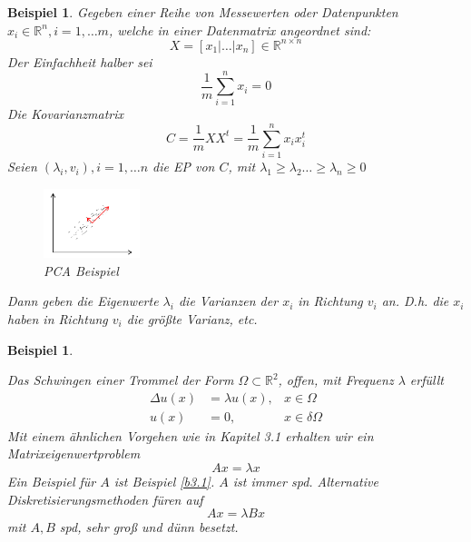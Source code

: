 \documentclass{book}
\newtheorem{example}[algorithm]{Beispiel}
\def\R{\mathbb{R}}
\begin{document}
            \begin{example}\label{b4.5}
                Gegeben einer Reihe von Messewerten  oder Datenpunkten $x_i\in\R^n,i=1,\dots m$, welche in einer Datenmatrix angeordnet sind:
                \begin{equation*}
                    X=[x_1\vert\dots\vert x_n]\in\R^{n\times n}
                \end{equation*}
                Der Einfachheit halber sei \[\frac{1}{m}\sum_{i=1}^nx_i=0\]
                Die Kovarianzmatrix 
                \[C=\frac{1}{m}XX^t=\frac{1}{m}\sum_{i=1}^n x_ix_i^t\]
                Seien $(\lambda_i,v_i),i=1,\dots n$ die EP von $C$, mit $\lambda_1\geq \lambda_2\dots\geq \lambda_n\geq 0$ 
                \begin{figure}[H]
                    \centering
                    \includegraphics[width=0.25\textwidth]{Bild012}
                    \caption{PCA Beispiel}
                \end{figure}
                Dann geben die Eigenwerte $\lambda_i$ die Varianzen der $x_i$ in Richtung $v_i$ an. D.h. die $x_i$ haben in Richtung 
                $v_i$ die größte Varianz, etc.
            \end{example}

            \begin{example}\label{b4.6}
                
                Das Schwingen einer Trommel der Form $\Omega\subset \R^2$, offen, mit Frequenz $\lambda$ erfüllt
                \begin{align*}
                    \Delta u(x)&=\lambda u(x), & x\in\Omega \\ 
                    u(x)&=0, & x\in\delta\Omega 
                \end{align*}
                Mit einem ähnlichen Vorgehen wie in Kapitel 3.1 erhalten wir ein Matrixeigenwertproblem 
                \[
                    Ax=\lambda x    
                \]
                Ein Beispiel für $A$ ist Beispiel \ref*{b3.1}. $A$ ist immer spd. Alternative Diskretisierungsmethoden 
                füren auf 
                \[
                    Ax=\lambda Bx    
                \]
                mit $A,B$ spd, sehr groß und dünn besetzt.

            \end{example}
\end{document}
